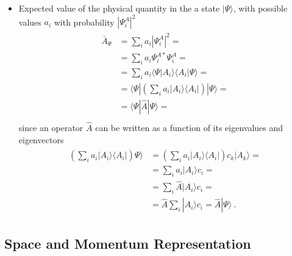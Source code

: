 \documentclass[letterpaper,10pt,english]{jupyterBook}
\begin{document}
\begin{itemize}
\item {} 
\sphinxAtStartPar
Expected value of the physical quantity in the a state \(|\Psi\rangle\), with possible values \(a_i\) with probability \(|\Psi_i^A|^2\)
\begin{equation*}
\begin{split}\begin{aligned}
    \bar{A}_{\Psi} & = \sum_i a_i |\Psi_i^A|^2 = \\
            & = \sum_i a_i \Psi_i^{A*} \Psi_i^A =  \\ 
            & = \sum_i a_i \langle \Psi | A_i \rangle \langle A_i | \Psi \rangle = \\
            & = \langle \Psi | \left( \sum_i a_i | A_i \rangle \langle A_i | \right) | \Psi \rangle = \\
            & = \langle \Psi | \hat{A} | \Psi \rangle = \\
  \end{aligned}\end{split}
\end{equation*}
\sphinxAtStartPar
since an operator \(\hat{A}\) can be written as a function of its eigenvalues and eigenvectors
\begin{equation*}
\begin{split}\begin{aligned}
   \left( \sum_i a_i | A_i \rangle \langle A_i | \right) \Psi \rangle 
   & = \left( \sum_i a_i | A_i \rangle \langle A_i | \right) c_k | A_k \rangle = \\
   & =  \sum_i a_i | A_i \rangle c_i = \\
   & =  \sum_i \hat{A} | A_i \rangle c_i = \\
   & = \hat{A} \sum_i | A_i \rangle c_i = \hat{A} | \Psi \rangle \ . 
   \end{aligned}\end{split}
\end{equation*}
\end{itemize}




\subsection{Space and Momentum Representation}
\label{\detokenize{ch/quantum-mechanics/intro:space-and-momentum-representation}}\label{\detokenize{ch/quantum-mechanics/intro:quantum-mechanics-intro-non-relativistic-basis}}
\end{document}
